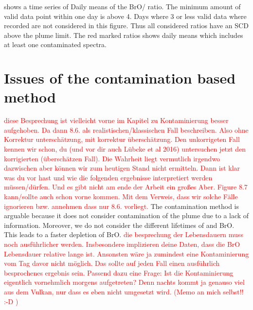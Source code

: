 \documentclass  [
  paper    = a4,
  BCOR     = 10mm,
  twoside,
  fontsize = 12pt,
  fleqn,
  toc      = bibnumbered,
  toc      = listofnumbered,
  numbers  = noendperiod,
  headings = normal,
  listof   = leveldown,
  version  = 3.03
]                                       {scrreprt}
\begin{document}
	 shows a time series of Daily means of the BrO/ ratio. The minimum amount of valid data point within one day is above 4. Days where 3 or less valid data where recorded are not considered in this figure.  Thus all considered ratios have an  SCD above the plume limit. The red marked ratios shows daily means which includes at least one contaminated spectra.
%
%
\FloatBarrier
	\section{Issues of the contamination based method}
	\textcolor{red}{diese Besprechung ist vielleicht vorne im Kapitel zu Kontaminierung besser aufgehoben. Da dann 8.6. als realistischen/klassischen Fall beschreiben. Also ohne Korrektur unterschätzung, mit korrektur überschätzung. Den unkorrigeten Fall kennen wir schon, du (und vor dir auch Lübcke et al 2016) untersuchen jetzt den korrigierten (überschätzen Fall). Die Wahrheit liegt vermutlich irgendwo dazwischen aber können wir zum heutigen Stand nicht ermitteln. Dann ist klar was du vor hast und wie die folgenden ergebnisse interpretiert werden müssen/dürfen. Und es gibt nicht am ende der Arbeit ein großes Aber. Figure 8.7 kann/sollte auch schon vorne kommen. Mit dem Verweis, dass wir solche Fälle ignorieren bzw. annehmen dass nur 8.6. vorliegt.}
	The contamination method is arguable because it does not consider contamination of the plume due to a lack of information. Moreover, we do not consider the different lifetimes of  and BrO. This leads to a faster depletion of BrO.
	\textcolor{red}{die besprechung der Lebensdauern muss noch ausführlicher werden. Insbesondere implizieren deine Daten, dass die BrO Lebensdauer relative lange ist. Ansonsten wäre ja zumindest eine Kontaminierung vom Tag davor nicht möglich. Das sollte auf jeden Fall einen ausführlich besprochenes ergebnis sein. Passend dazu eine Frage: Ist die Kontaminierung eigentlich vornehmlich morgens aufgetreten? Denn nachts kommt ja genauso viel  aus dem Vulkan, nur dass es eben nicht umgesetzt wird. (Memo an mich selbst!! :-D )}
\end{document}
